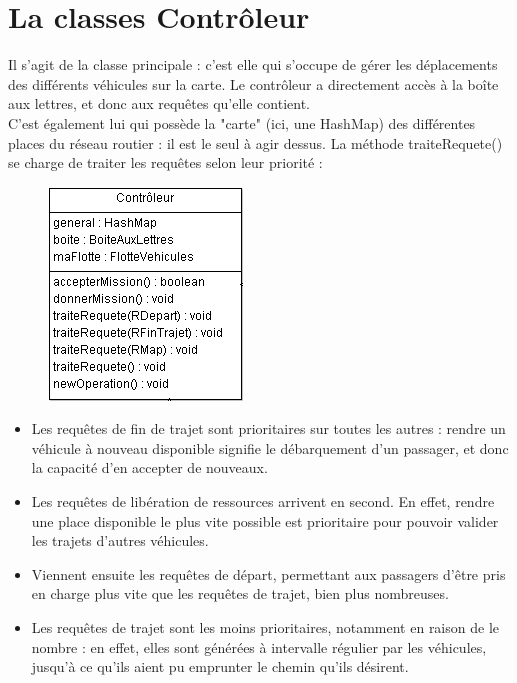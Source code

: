 \documentclass[a4paper, titlepage]{report}
\begin{document}
\section{La classes Contrôleur}



Il s'agit de la classe principale : c'est elle qui s'occupe de gérer les déplacements des différents véhicules sur la carte. Le contrôleur a directement accès à la boîte aux lettres, et donc aux requêtes qu'elle contient.\\
C'est également lui qui possède la "carte" (ici, une HashMap) des différentes places du réseau routier : il est le seul à agir dessus.
La méthode traiteRequete() se charge de traiter les requêtes selon leur priorité :
\begin{figure}
\includegraphics[scale=1]{Images/controleur.png}
\end{figure}
 \begin{itemize}
      \item Les requêtes de fin de trajet sont prioritaires sur toutes les autres : rendre un véhicule à nouveau disponible signifie le débarquement d'un passager, et donc la capacité d'en accepter de nouveaux.
      \item Les requêtes de libération de ressources arrivent en second. En effet, rendre une place disponible le plus vite possible est prioritaire pour pouvoir valider les trajets d'autres véhicules.
      \item Viennent ensuite les requêtes de départ, permettant aux passagers d'être pris en charge plus vite que les requêtes de trajet, bien plus nombreuses.
      \item Les requêtes de trajet sont les moins prioritaires, notamment en raison de le nombre : en effet, elles sont générées à intervalle régulier par les véhicules, jusqu'à ce qu'ils aient pu emprunter le chemin qu'ils désirent.
      \end{itemize}
\end{document}
